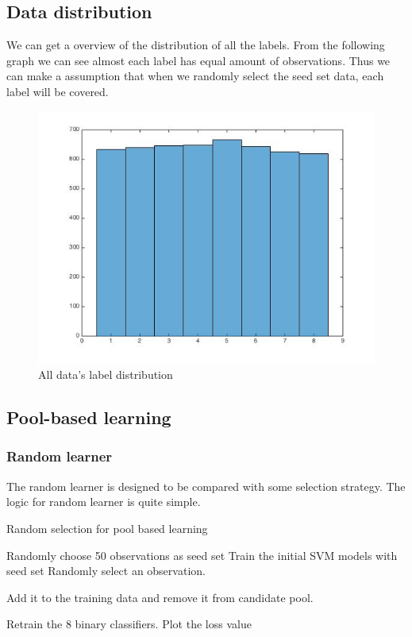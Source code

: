 \documentclass{article}
\begin{document}
\subsection{Data distribution} \label{data_distribution}
We can get a overview of the distribution of all the labels. From the following graph we can see almost each label has equal amount of observations. Thus we can make a assumption that when we randomly select the seed set data, each label will be covered.
\begin{figure}
\centering
\includegraphics[scale=0.5]{label_distribution}  
\caption{All data's label distribution}
\end{figure}
\subsection{Pool-based learning}

\subsubsection{Random learner}
The random learner is designed to be compared with some selection strategy. The logic for random learner is quite simple.

\begin{algorithm}[H]
	\caption{Random selection for pool based learning}
	\begin{algorithmic}
		\State Randomly choose 50 observations as seed set
		\State Train the initial SVM models with seed set
			Randomly select an observation.
			
			Add it to the training data and remove it from candidate pool. 
			
			Retrain the 8 binary classifiers.
		\EndWhile
	\State Plot the loss value
	\end{algorithmic}
\end{algorithm}
\end{document}
